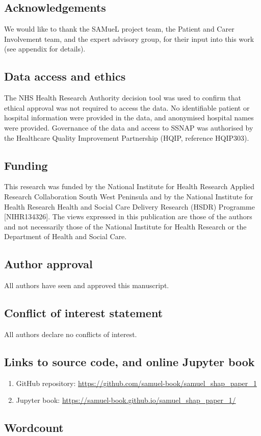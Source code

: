 \subsection*{Acknowledgements}

We would like to thank the SAMueL project team, the Patient and Carer Involvement team, and the expert advisory group, for their input into this work (see appendix for details).

\subsection*{Data access and ethics}

The NHS Health Research Authority decision tool was used to confirm that ethical approval was not required to access the data. No identifiable patient or hospital information were provided in the data, and anonymised hospital names were provided. Governance of the data and access to SSNAP was authorised by the Healthcare Quality Improvement Partnership (HQIP, reference HQIP303). 

\subsection*{Funding}

This research was funded by the National Institute for Health Research Applied Research Collaboration South West Peninsula and by the National Institute for Health Research Health and Social Care Delivery Research (HSDR) Programme [NIHR134326]. The views expressed in this publication are those of the authors and not necessarily those of the National Institute for Health Research or the Department of Health and Social Care.

\subsection*{Author approval}

All authors have seen and approved this manuscript.

\subsection*{Conflict of interest statement}

All authors declare no conflicts of interest.

\subsection*{Links to source code, and online Jupyter book}
\begin{enumerate}
    \item GitHub repository: \url{https://github.com/samuel-book/samuel_shap_paper_1} 
    \item Jupyter book: \url{https://samuel-book.github.io/samuel_shap_paper_1/}
\end{enumerate}


\newpage
\subsection*{Wordcount}
